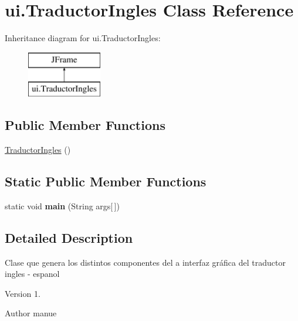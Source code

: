 \hypertarget{classui_1_1_traductor_ingles}{}\section{ui.\+Traductor\+Ingles Class Reference}
\label{classui_1_1_traductor_ingles}
Inheritance diagram for ui.\+Traductor\+Ingles\+:\begin{figure}[H]
\begin{center}
\leavevmode
\includegraphics[height=2.000000cm]{classui_1_1_traductor_ingles}
\end{center}
\end{figure}
\subsection*{Public Member Functions}
\begin{DoxyCompactItemize}
\item 
\mbox{\hyperlink{classui_1_1_traductor_ingles_a42afbb0d287dd889fac0fcdd1c982166}{Traductor\+Ingles}} ()
\end{DoxyCompactItemize}
\subsection*{Static Public Member Functions}
\begin{DoxyCompactItemize}
\item 
\mbox{\label{classui_1_1_traductor_ingles_abcff07dd7cd472c15b0f37814b3b9eaa}} 
static void {\bfseries main} (String args\mbox{[}$\,$\mbox{]})
\end{DoxyCompactItemize}


\subsection{Detailed Description}
Clase que genera los distintos componentes del a interfaz gráfica del traductor ingles -\/ espanol \begin{DoxyVersion}{Version}
1. 
\end{DoxyVersion}
\begin{DoxyAuthor}{Author}
manue 
\end{DoxyAuthor}


